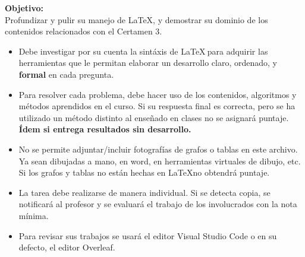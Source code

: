 \textbf{Objetivo:}\\
Profundizar y pulir su manejo de \LaTeX, y demostrar su dominio de los contenidos relacionados con el Certamen 3.

\begin{itemize}
    \item Debe investigar por su cuenta la sintáxis de \LaTeX $~$para adquirir las herramientas que le permitan elaborar un desarrollo claro, ordenado, y \textbf{formal} en cada pregunta.
    
    \item Para resolver cada problema, debe hacer uso de los contenidos, algoritmos y métodos aprendidos en el curso. Si su respuesta final es correcta, pero se ha utilizado un método distinto al enseñado en clases no se asignará puntaje. \textbf{Ídem si entrega resultados sin desarrollo.}
    
    \item No se permite adjuntar/incluir fotografías de grafos o tablas en este archivo. Ya sean dibujadas a mano, en word, en herramientas virtuales de dibujo, etc. Si los grafos y tablas no están hechas en \LaTeX no obtendrá puntaje.
    
    \item La tarea debe realizarse de manera individual. Si se detecta copia, se notificará al profesor y se evaluará el trabajo de los involucrados con la nota mínima.
    
    \item Para revisar sus trabajos se usará el editor Visual Studio Code o en su defecto, el editor Overleaf.
    
\end{itemize}